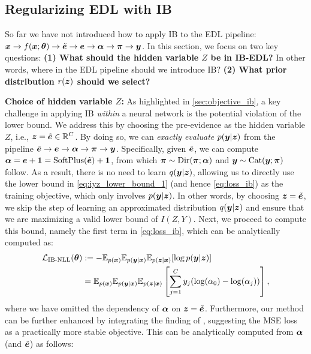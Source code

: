 \subsection{Regularizing EDL with IB}\label{sec:reg_edl_with_ib}
So far we have not introduced how to apply IB to the EDL pipeline: $\bm{x} \rightarrow f(\bm{x}; \bm{\theta}) \rightarrow \tilde{\bm{e}} \rightarrow \bm{e} \rightarrow \bm{\alpha} \rightarrow \bm{\pi} \rightarrow \bm{y}$. In this section, we focus on two key questions: \textbf{(1) What should the hidden variable $Z$ be in IB-EDL?} In other words, where in the EDL pipeline should we introduce IB? \textbf{(2) What prior distribution $r(\bm{z})$ should we select?}

\textbf{Choice of hidden variable $Z$:} As highlighted in \cref{sec:objective_ib}, a key challenge in applying IB \emph{within} a neural network is the potential violation of the lower bound. We address this by choosing the pre-evidence as the hidden variable $Z$, i.e., $\bm{z} = \tilde{\bm{e}} \in \mathbb{R}^C$. By doing so, we can \emph{exactly evaluate} $p(\bm{y}|\bm{z})$ from the pipeline $\tilde{\bm{e}} \rightarrow \bm{e} \rightarrow \bm{\alpha} \rightarrow \bm{\pi} \rightarrow \bm{y}$. Specifically, given $\tilde{\bm{e}}$, we can compute $\bm{\alpha} = \bm{e} + \bm{1} = \text{SoftPlus}(\tilde{\bm{e}}) + \bm{1}$, from which $\bm{\pi} \sim \text{Dir}(\bm{\pi}; \bm{\alpha})$ and $\bm{y} \sim \text{Cat}(\bm{y}; \bm{\pi})$ follow. 
As a result, there is no need to learn $q(\bm{y} | \bm{z})$, allowing us to directly use the lower bound in \cref{eq:iyz_lower_bound_1} (and hence \cref{eq:loss_ib}) as the training objective, which only involves $p(\bm{y} | \bm{z})$. In other words, by choosing $\bm{z} = \tilde{\bm{e}}$, we skip the step of learning an approximated distribution $q(\bm{y} | \bm{z})$ and ensure that we are maximizing a valid lower bound of $I(Z, Y)$. Next, we proceed to compute this bound, namely the first term in \cref{eq:loss_ib}, which can be analytically computed as:
\begin{equation}
    \begin{aligned}
         \mathcal{L}_{\text{IB-NLL}}(\bm{\theta}) &:=- \mathbb{E}_{p(\bm{x})} \mathbb{E}_{p(\bm{y}|\bm{x})} \mathbb{E}_{p(\bm{z} | \bm{x})}[\log p(\bm{y} |\bm{z})] \\
         &= \mathbb{E}_{p(\bm{x})} \mathbb{E}_{p(\bm{y}|\bm{x})} \mathbb{E}_{p(\bm{z} | \bm{x})}\left[ \sum_{j=1}^C y_j ( \log(\alpha_0) - \log(\alpha_j))\right],
    \end{aligned}
\end{equation}
where we have omitted the dependency of $\bm{\alpha}$ on $\bm{z} = \tilde{\bm{e}}$. Furthermore, our method can be further enhanced by integrating the finding of \citet{sensoy2018evidential}, suggesting the MSE loss as a practically more stable objective. This can be analytically computed from $\bm{\alpha}$ (and $\tilde{\bm{e}}$) as follows:
